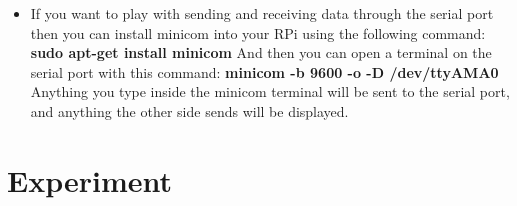 \documentclass[11pt,a4paper]{article}
\begin{document}
\begin{itemize}
		\item If you want to play with sending and receiving data through the serial port then you can install minicom into your RPi using the following command:
		\newline \textbf{sudo apt-get install minicom}
		\newline And then you can open a terminal on the serial port with this command:
		\newline \textbf{minicom -b 9600 -o -D /dev/ttyAMA0}
		\newline Anything you type inside the minicom terminal will be sent to the serial port, and anything the other side sends will be displayed.
	\end{itemize}
	\flushleft
	\section{Experiment}
\end{document}
